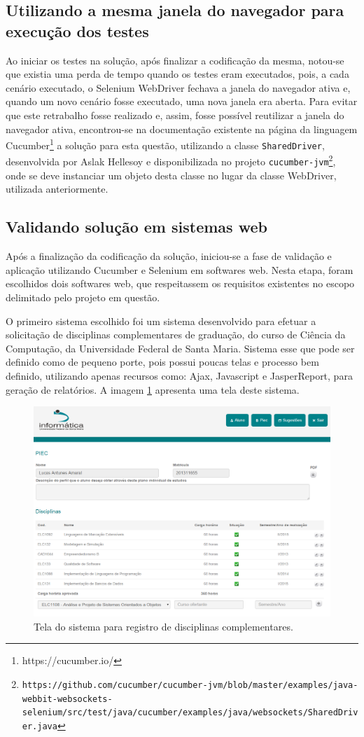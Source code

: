 \documentclass[tg]{mdtufsm}
\begin{document}
\subsection{Utilizando a mesma janela do navegador para execução dos testes}
Ao iniciar os testes na solução, após finalizar a codificação da mesma, notou-se que existia uma perda de tempo quando os testes eram executados, pois, a cada cenário executado, o Selenium WebDriver fechava a janela do navegador ativa e, quando um novo cenário fosse executado, uma nova janela era aberta. Para evitar que este retrabalho fosse realizado e, assim, fosse possível reutilizar a janela do navegador ativa, encontrou-se na documentação existente na página da linguagem Cucumber\footnote{https://cucumber.io/} a solução para esta questão, utilizando a classe \texttt{SharedDriver}, desenvolvida por Aslak Hellesoy e disponibilizada no projeto \texttt{cucumber-jvm\footnote{https://github.com/cucumber/cucumber-jvm/blob/master/examples/java-webbit-websockets-selenium/src/test/java/cucumber/examples/java/websockets/SharedDriver.java}}, onde se deve instanciar um objeto desta classe no lugar da classe WebDriver, utilizada anteriormente.

\subsection{Validando solução em sistemas web}
Após a finalização da codificação da solução, iniciou-se a fase de validação e aplicação utilizando Cucumber e Selenium em softwares web. Nesta etapa, foram escolhidos dois softwares web, que respeitassem os requisitos existentes no escopo delimitado pelo projeto em questão. 

O primeiro sistema escolhido foi um sistema desenvolvido para efetuar a solicitação de disciplinas complementares de graduação, do curso de Ciência da Computação, da Universidade Federal de Santa Maria. Sistema esse que pode ser definido como de pequeno porte, pois possui poucas telas e processo bem definido, utilizando apenas recursos como: Ajax, Javascript e JasperReport, para geração de relatórios. A imagem \ref{fig:piec} apresenta uma tela deste sistema.

\begin{figure}[!htb]
	\centering
	\includegraphics[width=0.5
	\textwidth]{piec}
	\caption{Tela do sistema para registro de disciplinas complementares.}
	\label{fig:piec}
\end{figure}
\end{document}
